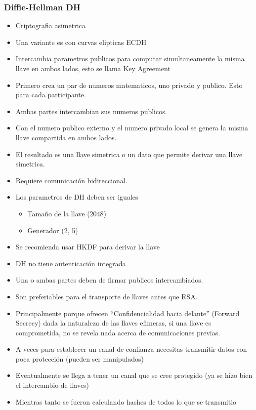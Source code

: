 \documentclass[11pt]{article}
\begin{document}
\subsubsection{Diffie-Hellman DH}
\label{sec:orgc660f7d}
\begin{itemize}
\item Criptografia asimetrica
\item Una variante es con curvas elipticas ECDH
\item Intercambia parametros publicos para computar simultaneamente la misma llave en ambos lados, esto se llama Key Agreement

\item Primero crea un par de numeros matematicos, uno privado y publico. Esto para cada participante.
\item Ambas partes intercambian sus numeros publicos.
\item Con el numero publico externo y el numero privado local se genera la misma llave compartida en ambos lados.

\item El resultado es una llave simetrica o un dato que permite derivar una llave simetrica.
\item Requiere comunicación bidireccional.
\item Los parametros de DH deben ser iguales
\begin{itemize}
\item Tamaño de la llave (2048)
\item Generador (2, 5)
\end{itemize}

\item Se recomienda usar HKDF para derivar la llave
\item DH no tiene autenticación integrada
\item Una o ambas partes deben de firmar publicos intercambiados.

\item Son preferiables para el transporte de llaves antes que RSA.
\item Principalmente porque ofrecen ``Confidencialidad hacia delante'' (Forward Secrecy) dada la naturaleza de las llaves efimeras, si una llave es comprometida, no se revela nada acerca de comunicaciones previas.

\item A veces para establecer un canal de confianza necesitas transmitir datos con poca protección (pueden ser manipulados)
\item Eventualmente se llega a tener un canal que se cree protegido (ya se hizo bien el intercambio de llaves)
\item Mientras tanto se fueron calculando hashes de todos lo que se transmitio
\end{itemize}
\end{document}
